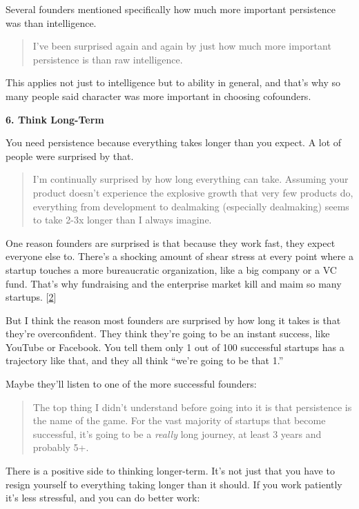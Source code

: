 Several founders mentioned specifically how much more important
persistence was than intelligence.

\begin{quote}
I've been surprised again and again by just how much more important
persistence is than raw intelligence.
\end{quote}

This applies not just to intelligence but to ability in general, and
that's why so many people said character was more important in choosing
cofounders.

\textbf{6. Think Long-Term}

You need persistence because everything takes longer than you expect. A
lot of people were surprised by that.

\begin{quote}
I'm continually surprised by how long everything can take. Assuming your
product doesn't experience the explosive growth that very few products
do, everything from development to dealmaking (especially dealmaking)
seems to take 2-3x longer than I always imagine.
\end{quote}

One reason founders are surprised is that because they work fast, they
expect everyone else to. There's a shocking amount of shear stress at
every point where a startup touches a more bureaucratic organization,
like a big company or a VC fund. That's why fundraising and the
enterprise market kill and maim so many startups.
{[}\hyperref[f2n]{2}{]}

But I think the reason most founders are surprised by how long it takes
is that they're overconfident. They think they're going to be an instant
success, like YouTube or Facebook. You tell them only 1 out of 100
successful startups has a trajectory like that, and they all think
``we're going to be that 1.''

Maybe they'll listen to one of the more successful founders:

\begin{quote}
The top thing I didn't understand before going into it is that
persistence is the name of the game. For the vast majority of startups
that become successful, it's going to be a \emph{really} long journey,
at least 3 years and probably 5+.
\end{quote}

There is a positive side to thinking longer-term. It's not just that you
have to resign yourself to everything taking longer than it should. If
you work patiently it's less stressful, and you can do better work:

